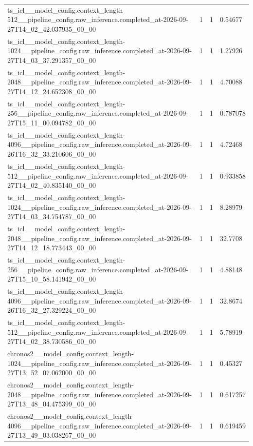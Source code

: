 \begin{tabular}{llll}
ts\_icl\_\_model\_config.context\_length-512\_\_pipeline\_config.raw\_inference.completed\_at-2026-09-27T14\_02\_42.037935\_00\_00 & 1 & 1 & 0.54677 \\
ts\_icl\_\_model\_config.context\_length-1024\_\_pipeline\_config.raw\_inference.completed\_at-2026-09-27T14\_03\_37.291357\_00\_00 & 1 & 1 & 1.27926 \\
ts\_icl\_\_model\_config.context\_length-2048\_\_pipeline\_config.raw\_inference.completed\_at-2026-09-27T14\_12\_24.652308\_00\_00 & 1 & 1 & 4.70088 \\
ts\_icl\_\_model\_config.context\_length-256\_\_pipeline\_config.raw\_inference.completed\_at-2026-09-27T15\_11\_00.094782\_00\_00 & 1 & 1 & 0.787078 \\
ts\_icl\_\_model\_config.context\_length-4096\_\_pipeline\_config.raw\_inference.completed\_at-2026-09-26T16\_32\_33.210606\_00\_00 & 1 & 1 & 4.72468 \\
ts\_icl\_\_model\_config.context\_length-512\_\_pipeline\_config.raw\_inference.completed\_at-2026-09-27T14\_02\_40.835140\_00\_00 & 1 & 1 & 0.933858 \\
ts\_icl\_\_model\_config.context\_length-1024\_\_pipeline\_config.raw\_inference.completed\_at-2026-09-27T14\_03\_34.754787\_00\_00 & 1 & 1 & 8.28979 \\
ts\_icl\_\_model\_config.context\_length-2048\_\_pipeline\_config.raw\_inference.completed\_at-2026-09-27T14\_12\_18.773443\_00\_00 & 1 & 1 & 32.7708 \\
ts\_icl\_\_model\_config.context\_length-256\_\_pipeline\_config.raw\_inference.completed\_at-2026-09-27T15\_10\_58.141942\_00\_00 & 1 & 1 & 4.88148 \\
ts\_icl\_\_model\_config.context\_length-4096\_\_pipeline\_config.raw\_inference.completed\_at-2026-09-26T16\_32\_27.329224\_00\_00 & 1 & 1 & 32.8674 \\
ts\_icl\_\_model\_config.context\_length-512\_\_pipeline\_config.raw\_inference.completed\_at-2026-09-27T14\_02\_38.730586\_00\_00 & 1 & 1 & 5.78919 \\
chronos2\_\_model\_config.context\_length-1024\_\_pipeline\_config.raw\_inference.completed\_at-2026-09-27T13\_52\_07.062000\_00\_00 & 1 & 1 & 0.45327 \\
chronos2\_\_model\_config.context\_length-2048\_\_pipeline\_config.raw\_inference.completed\_at-2026-09-27T13\_48\_04.475399\_00\_00 & 1 & 1 & 0.617257 \\
chronos2\_\_model\_config.context\_length-4096\_\_pipeline\_config.raw\_inference.completed\_at-2026-09-27T13\_49\_03.038267\_00\_00 & 1 & 1 & 0.619459 \\

\end{tabular}
